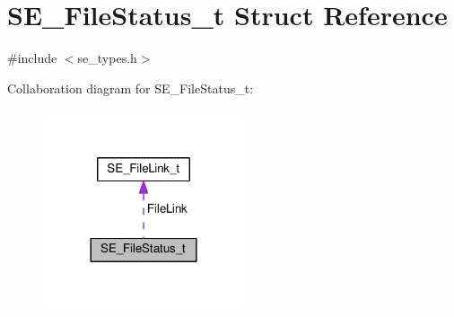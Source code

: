 \hypertarget{structSE__FileStatus__t}{}\section{S\+E\+\_\+\+File\+Status\+\_\+t Struct Reference}
\label{structSE__FileStatus__t}


{\ttfamily \#include $<$se\+\_\+types.\+h$>$}



Collaboration diagram for S\+E\+\_\+\+File\+Status\+\_\+t\+:\nopagebreak
\begin{figure}[H]
\begin{center}
\leavevmode
\includegraphics[width=168pt]{structSE__FileStatus__t__coll__graph}
\end{center}
\end{figure}
